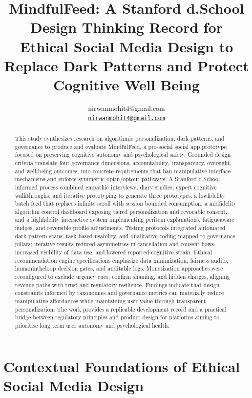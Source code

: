 \documentclass{article}
\title{MindfulFeed: A Stanford d.School Design Thinking Record for Ethical Social Media Design to Replace Dark Patterns and Protect Cognitive Well Being}
\author{nirwanmohit4@gmail.com\\
\texttt{\href{mailto:nirwanmohit4@gmail.com}{nirwanmohit4@gmail.com}}}
\begin{document}
\tableofcontents
\maketitle

\begin{abstract}
This study synthesizes research on algorithmic personalization, dark patterns, and governance to produce and evaluate MindfulFeed, a pro-social social app prototype focused on preserving cognitive autonomy and psychological safety. Grounded design criteria translate four governance dimensions, accountability, transparency, oversight, and well-being outcomes, into concrete requirements that ban manipulative interface mechanisms and enforce symmetric opt\-in/opt\-out pathways. A Stanford d.School informed process combined empathic interviews, diary studies, expert cognitive walkthroughs, and iterative prototyping to generate three prototypes: a low\-fidelity batch feed that replaces infinite scroll with session bounded consumption, a mid\-fidelity algorithm control dashboard exposing tiered personalization and revocable consent, and a high\-fidelity interactive system implementing per\-item explanations, fatigue\-aware nudges, and reversible profile adjustments. Testing protocols integrated automated dark pattern scans, task based usability, and qualitative coding mapped to governance pillars; iterative results reduced asymmetries in cancellation and consent flows, increased visibility of data use, and lowered reported cognitive strain. Ethical recommendation engine specifications emphasize data minimization, fairness audits, human\-in\-the\-loop decision gates, and auditable logs. Monetization approaches were reconfigured to exclude urgency cues, confirm shaming, and hidden charges, aligning revenue paths with trust and regulatory resilience. Findings indicate that design constraints informed by taxonomies and governance metrics can materially reduce manipulative affordances while maintaining user value through transparent personalization. The work provides a replicable development record and a practical bridge between regulatory principles and product design for platforms aiming to prioritise long term user autonomy and psychological health.
\end{abstract}



\section{Contextual Foundations of Ethical Social Media Design}
\end{document}
